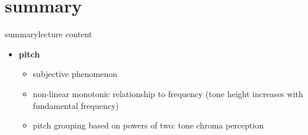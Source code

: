     \section{summary}
        \begin{frame}{summary}{lecture content}
            \begin{itemize}
                \item   \textbf{pitch}
                    \begin{itemize}
                        \item   subjective phenomenon
                        \item   non-linear monotonic relationship to frequency (tone height increases with fundamental frequency)
                        \item   pitch grouping based on powers of two: tone chroma perception
                    \end{itemize}
            \end{itemize}
        \end{frame}


